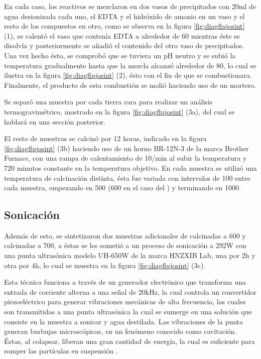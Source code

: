 \documentclass[../main.tex]{subfiles}
\begin{document}
    En cada caso, los reactivos se mezclaron en dos vasos de precipitados con 20ml de agua desionizada cada uno, el EDTA y el hidróxido de amonio en un vaso y el resto de los compuestos en otro, como se observa en la figura \ref{fig:diagflujosint} (1), se calentó el vaso que contenía EDTA a alrededor de 60\gradoC{} mientras éste se disolvía y posteriormente se añadió el contenido del otro vaso de precipitados. Una vez hecho ésto, se comprobó que se tuviera un pH neutro y se subió la temperatura gradualmente hasta que la mezcla alcanzó alrededor de 80\gradoC{}, lo cual se ilustra en la figura \ref{fig:diagflujosint} (2), ésto con el fin de que se combustionara. Finalmente, el producto de esta combustión se molió haciendo uso de un mortero. 
    
    Se separó una muestra por cada tierra rara para realizar un análisis termogravimétrico, mostrado en la figura \ref{fig:diagflujosint} (3a), del cual se hablará en una sección posterior.

    El resto de muestras se calcinó por 12 horas, indicado en la figura \ref{fig:diagflujosint} (3b) haciendo uso de un horno BR-12N-3 de la marca Brother Furnace, con una rampa de calentamiento de 10\gradoC{}/min al subir la temperatura y 720 minutos constante en la temperatura objetivo. En cada muestra se utilizó una temperatura de calcinación distinta, ésta fue variada con intervalos de 100\gradoC{} entre cada muestra, empezando en 500\gradoC{} (600\gradoC{} en el caso del \sama{}) y terminando en 1000\gradoC{}.
\subsection{Sonicación}
    Además de esto, se sintetizaron dos muestras adicionales de \neod{} calcinadas a 600\gradoC{} y \sama{} calcinadas a 700\gradoC{}, a éstas se les sometió a un proceso de sonicación a 292W con una punta ultrasónica modelo UH-650W de la marca HNZXIB Lab, una por 2h y otra por 4h, lo cual se muestra en la figura \ref{fig:diagflujosint} (3c).

    Esta técnica funciona a través de un generador electrónico que transforma una entrada de corriente alterna a una señal de 20kHz, la cual controla un convertidor piezoeléctrico para generar vibraciones mecánicas de alta frecuencia, las cuales son transmitidas a una punta ultrasónica la cual se sumerge en una solución que consiste en la muestra a sonicar y agua destilada. Las vibraciones de la punta generan burbujas microscópicas, en un fenómeno conocido como cavitación. Éstas, al colapsar, liberan una gran cantidad de energía, la cual es suficiente para romper las partículas en suspensión \cite{sonicaciondef}.
\end{document}
